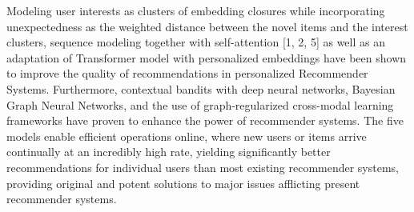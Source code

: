 Modeling user interests as clusters of embedding closures while incorporating unexpectedness as the weighted distance between the novel items and the interest clusters, sequence modeling together with self-attention [1, 2, 5] as well as an adaptation of Transformer model with personalized embeddings have been shown to improve the quality of recommendations in personalized Recommender Systems. Furthermore, contextual bandits with deep neural networks, Bayesian Graph Neural Networks, and the use of graph-regularized cross-modal learning frameworks have proven to enhance the power of recommender systems. The five models enable efficient operations online, where new users or items arrive continually at an incredibly high rate, yielding significantly better recommendations for individual users than most existing recommender systems, providing original and potent solutions to major issues afflicting present recommender systems.